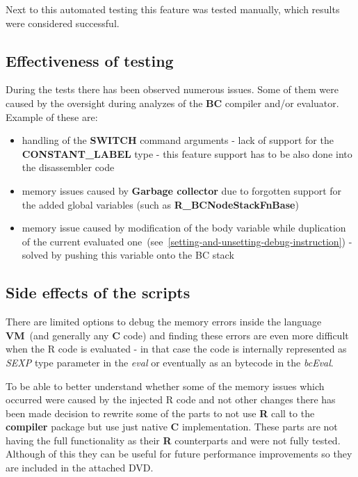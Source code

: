 \documentclass[thesis=M,english]{FITthesis}[2018/10/20]
\begin{document}
Next to this automated testing this feature was tested manually, which results were considered successful.

\subsection{Effectiveness of testing}

During the tests there has been observed numerous issues. Some of them were caused by the oversight during analyzes of the \textbf{BC} compiler and/or evaluator. Example of these are:
\begin{itemize}
	\item handling of the \textbf{SWITCH} command arguments - lack of support for the \textbf{CONSTANT{\_}LABEL} type - this feature support has to be also done into the disassembler code
	\item memory issues caused by \textbf{Garbage collector} due to forgotten support for the added global variables (such as \textbf{R{\_}BCNodeStackFnBase})
	\item memory issue caused by modification of the body variable while duplication of the current evaluated one~(see~\ref{setting-and-unsetting-debug-instruction}) - solved by pushing this variable onto the BC stack
\end{itemize}

\subsection{Side effects of the scripts}

There are limited options to debug the memory errors inside the language \textbf{VM}~(and generally any \textbf{C} code) and finding these errors are even more difficult when the  R code is evaluated - in that case the code is internally represented as \textit{SEXP} type parameter in the \textit{eval} or eventually as an bytecode in the \textit{bcEval}. 

To be able to better understand whether some of the memory issues which occurred were caused by the injected R code and not other changes there has been made decision to rewrite some of the parts to not use \textbf{R} call to the \textbf{compiler} package but use just native \textbf{C} implementation. These parts are not having the full functionality as their \textbf{R} counterparts and were not fully tested. Although of this they can be useful for future performance improvements so they are included in the attached DVD.
\end{document}
